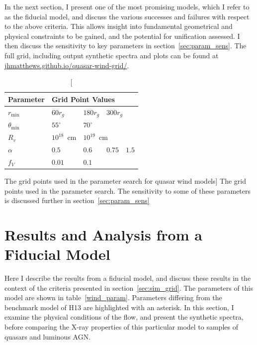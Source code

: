 In the next section, I present one of the most promising models,
which I refer to as the fiducial model, and discuss
the various successes and failures with respect to the above criteria.
This allows insight into fundamental geometrical 
and physical constraints to be gained, 
and the potential for unification assessed. 
I then discuss the sensitivity to key parameters in section~\ref{sec:param_sens}.
The full grid, including output synthetic spectra and plots can be found at
\url{jhmatthews.github.io/quasar-wind-grid/}.

\begin{table}
\centering
\begin{tabular}{p{2cm}p{1cm}p{1cm}p{1cm}p{1cm}}
Parameter & \multicolumn{4}{l}{Grid Point Values}  \\
\hline \hline 
$r_{\mathrm{min}}$ 	&	 $60r_{g}$ & $180r_{g}$ & \multicolumn{2}{l}{$300r_{g}$} \\ 
$\theta_{\mathrm{min}}$ 	& $55^{\circ}$ & \multicolumn{3}{l}{$70^{\circ}$} \\ 
$R_v$  	        &	 $10^{18}$~cm & \multicolumn{3}{l}{$10^{19}$~cm} \\ 
$\alpha$ 	&	 $0.5$ & $0.6$ & $0.75$ & $1.5$ \\
$f_V$ 	&	 $0.01$ & \multicolumn{3}{l}{$0.1$}  \\
\hline 
\end{tabular}
\caption
[The grid points used in the parameter search for quasar wind models]
{The grid points used in the parameter search.
The sensitivity to some of these parameters is discussed 
further in section~\ref{sec:param_sens}}
\label{grid_table}
\end{table}







\section{Results and Analysis from a Fiducial Model}
\label{sec:qso_results}
Here I describe the results from a fiducial model,
and discuss these results in the context of the criteria 
presented in section~\ref{sec:sim_grid}. 
The parameters of this model are shown in table~\ref{wind_param}.
Parameters differing from the benchmark model of H13 are 
highlighted with an asterisk. In this section, I examine the physical 
conditions of the flow, and present the synthetic spectra, before comparing
the X-ray properties of this particular model to samples of
quasars and luminous AGN. 

